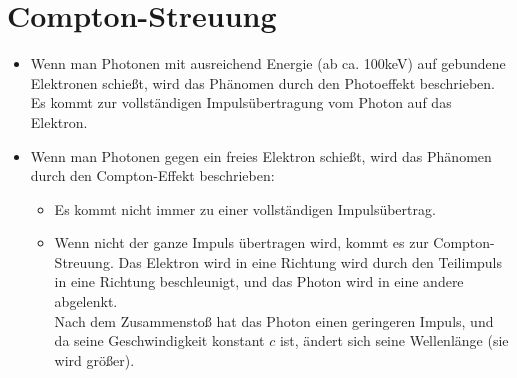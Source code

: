 \section{Compton-Streuung}
\begin{itemize}
\item Wenn man Photonen mit ausreichend Energie (ab ca. 100keV) auf gebundene Elektronen schießt, wird das Phänomen durch den Photoeffekt beschrieben. Es kommt zur vollständigen Impulsübertragung vom Photon auf das Elektron.
\item Wenn man Photonen gegen ein freies Elektron schießt, wird das Phänomen durch den Compton-Effekt beschrieben:
\begin{itemize}
\item Es kommt nicht immer zu einer vollständigen Impulsübertrag.
\item Wenn nicht der ganze Impuls übertragen wird, kommt es zur Compton-Streuung.
Das Elektron wird in eine Richtung wird durch den Teilimpuls in eine Richtung beschleunigt, und das Photon wird in eine andere abgelenkt.\\
Nach dem Zusammenstoß hat das Photon einen geringeren Impuls, und da seine Geschwindigkeit konstant $c$ ist, ändert sich seine Wellenlänge (sie wird größer).
\begin{comment}\item Durch den Impulserhaltungssatz gilt:\\
Vor Kollision:\\
$p_{gesamt} = p_{Phot} \rightarrow p_{gesamt}=\frac{h}{\lambda}$


Nach Kollision: \\
$p_{gesamt} = p'_{phot} + p_e$

$\frac{h}{\lambda} = \frac{h}{\lambda'} + m_e \cdot v$

$\frac{h}{\lambda} = \frac{h}{\lambda} \cdot \cos{\Theta} + \frac{h}{\lambda} \cdot (1-\cos{\Theta})$ \tabto{0.5\textwidth} ; $c = \lambda * f \rightarrow \lambda = c / f$

$\frac{h}{\lambda} = \frac{h}{\lambda} \cdot \cos{\Theta} + \frac{h}{\lambda} \cdot (1-\cos{\Theta})$





$m_e \cdot v = \frac{h}{\lambda}$ \tabto{0.5\textwidth} ; umstellen nach $\lambda$ 


$\lambda' = \lambda + \Delta\lambda$

$\lambda' - \lambda = \Delta\lambda$

$\lambda' - \lambda = $



\end{comment}
\end{itemize}
\end{itemize}
